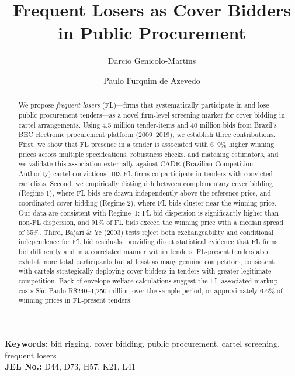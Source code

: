 \documentclass[12pt]{elsarticle}
\begin{document}
\begin{frontmatter}
\title{\textbf{Frequent Losers as Cover Bidders in Public Procurement}}
\author[INSPER]{Darcio Genicolo-Martins} 
\author[INSPER]{Paulo Furquim de Azevedo}
\address[INSPER]{INSPER --- Institute of Education and Research, S\~{a}o Paulo, Brazil}

\begin{abstract}
We propose \textit{frequent losers} (FL)---firms that systematically participate in and lose public procurement tenders---as a novel firm-level screening marker for cover bidding in cartel arrangements. Using 4.5 million tender-items and 40 million bids from Brazil's BEC electronic procurement platform (2009--2019), we establish three contributions. First, we show that FL presence in a tender is associated with 6--9\% higher winning prices across multiple specifications, robustness checks, and matching estimators, and we validate this association externally against CADE (Brazilian Competition Authority) cartel convictions: 193 FL firms co-participate in tenders with convicted cartelists. Second, we empirically distinguish between complementary cover bidding (Regime 1), where FL bids are drawn independently above the reference price, and coordinated cover bidding (Regime 2), where FL bids cluster near the winning price. Our data are consistent with Regime~1: FL bid dispersion is significantly higher than non-FL dispersion, and 91\% of FL bids exceed the winning price with a median spread of 55\%. Third, Bajari \& Ye (2003) tests reject both exchangeability and conditional independence for FL bid residuals, providing direct statistical evidence that FL firms bid differently and in a correlated manner within tenders. FL-present tenders also exhibit more total participants but at least as many genuine competitors, consistent with cartels strategically deploying cover bidders in tenders with greater legitimate competition. Back-of-envelope welfare calculations suggest the FL-associated markup costs S\~{a}o Paulo R\$240--1,250 million over the sample period, or approximately 6.6\% of winning prices in FL-present tenders.
\end{abstract}

\end{frontmatter}
\textbf{Keywords:} bid rigging, cover bidding, public procurement, cartel screening, frequent losers\\
\textbf{JEL No.:} D44, D73, H57, K21, L41
\end{document}
